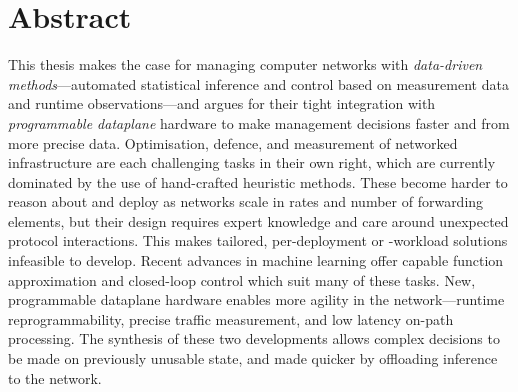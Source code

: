 \chapter*{Abstract}

\vspace{-2em}

This thesis makes the case for managing computer networks with \emph{data-driven methods}---automated statistical inference and control based on measurement data and runtime observations---and argues for their tight integration with \emph{programmable dataplane} hardware to make management decisions faster and from more precise data.
Optimisation, defence, and measurement of networked infrastructure are each challenging tasks in their own right, which are currently dominated by the use of hand-crafted heuristic methods.
These become harder to reason about and deploy as networks scale in rates and number of forwarding elements, but their design requires expert knowledge and care around unexpected protocol interactions.
This makes tailored, per-deployment or -workload solutions infeasible to develop.
Recent advances in machine learning offer capable function approximation and closed-loop control which suit many of these tasks.
New, programmable dataplane hardware enables more agility in the network---runtime reprogrammability, precise traffic measurement, and low latency on-path processing.
The synthesis of these two developments allows complex decisions to be made on previously unusable state, and made quicker by offloading inference to the network.

